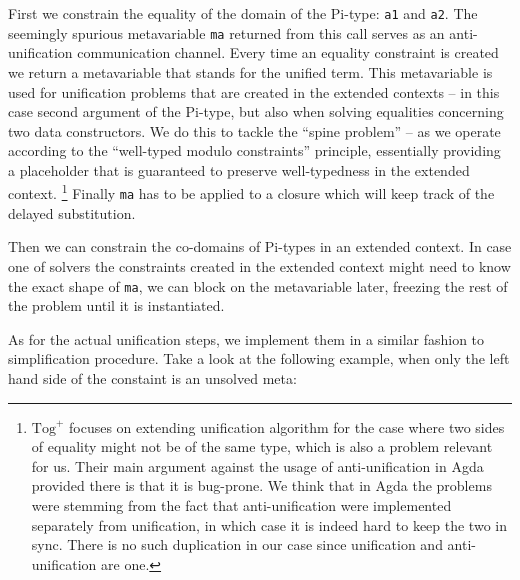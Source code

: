 \documentclass[
  sigconf,
  screen,
  review]{acmart}
\begin{document}
First we constrain the equality of the domain of the Pi-type:
\texttt{a1} and \texttt{a2}. The seemingly spurious metavariable
\texttt{ma} returned from this call serves as an anti-unification
\citep{pfenningUnificationAntiunificationCalculus1991} communication
channel. Every time an equality constraint is created we return a
metavariable that stands for the unified term. This metavariable is used
for unification problems that are created in the extended contexts -- in
this case second argument of the Pi-type, but also when solving
equalities concerning two data constructors. We do this to tackle the
``spine problem''
\citep[sec.~1.4]{victorlopezjuanPracticalHeterogeneousUnification2021}
-- as we operate according to the ``well-typed modulo constraints''
principle, essentially providing a placeholder that is guaranteed to
preserve well-typedness in the extended context. \footnote{\(\text{Tog}^{+}\)
  \citep{victorlopezjuanTog2020, victorlopezjuanPracticalHeterogeneousUnification2021}
  focuses on extending unification algorithm for the case where two
  sides of equality might not be of the same type, which is also a
  problem relevant for us. Their main argument against the usage of
  anti-unification in Agda provided there is that it is bug-prone. We
  think that in Agda the problems were stemming from the fact that
  anti-unification were implemented separately from unification, in
  which case it is indeed hard to keep the two in sync. There is no such
  duplication in our case since unification and anti-unification are
  one.} Finally \texttt{ma} has to be applied to a closure which will
keep track of the delayed substitution.

Then we can constrain the co-domains of Pi-types in an extended context.
In case one of solvers the constraints created in the extended context
might need to know the exact shape of \texttt{ma}, we can block on the
metavariable later, freezing the rest of the problem until it is
instantiated.

As for the actual unification steps, we implement them in a similar
fashion to simplification procedure. Take a look at the following
example, when only the left hand side of the constaint is an unsolved
meta:
\end{document}
